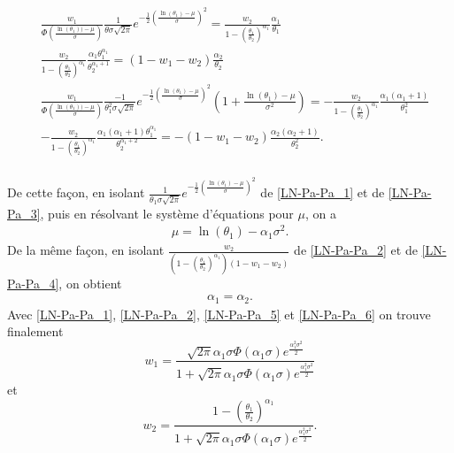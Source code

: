 	\begin{align}
		&\frac{w_1}{\Phi \left( \frac{\ln(\theta_1))- \mu}{\sigma} \right)}
		\frac{1}{\theta \sigma \sqrt{2 \pi}} e^{-\frac{1}{2} \left( \frac{\ln(\theta_1)- \mu}{\sigma} \right)^2}
		= \frac{w_2}{1-\left(\frac{\theta_1}{\theta_2}\right)^{\alpha_1}} \frac{\alpha_1}{\theta_1} \label{LN-Pa-Pa_1} \\
		&\frac{w_2}{1-\left(\frac{\theta_1}{\theta_2}\right)^{\alpha_1}} 
		\frac{\alpha_1 \theta_1^{\alpha_1}}{\theta_2^{\alpha_1+1}} 
		= (1-w_1-w_2) \frac{\alpha_2}{\theta_2}  \label{LN-Pa-Pa_2} \\
		&\frac{w_1}{\Phi \left( \frac{\ln(\theta_1))- \mu}{\sigma} \right)}
		\frac{-1}{\theta_1^2 \sigma \sqrt{2 \pi}} e^{-\frac{1}{2} \left( \frac{\ln(\theta_1)- \mu}{\sigma} \right)^2}
		(1+\frac{\ln(\theta_1) -\mu}{\sigma^2})
		= -\frac{w_2}{1-\left(\frac{\theta_1}{\theta_2}\right)^{\alpha_1}} 
		\frac{\alpha_1 (\alpha_1+1)}{\theta_1^2} \label{LN-Pa-Pa_3} \\
		&-\frac{w_2}{1-\left(\frac{\theta_1}{\theta_2}\right)^{\alpha_1}} 
		\frac{\alpha_1  (\alpha_1+1) \theta_1^{\alpha_1}}{\theta_2^{\alpha_1+2}} 
		=- (1-w_1-w_2) \frac{\alpha_2  (\alpha_2+1)}{\theta_2^2}. \label{LN-Pa-Pa_4} \\
	\end{align}
	
	De cette façon, en isolant $\frac{1}{\theta_1 \sigma \sqrt{2 \pi}} e^{-\frac{1}{2} \left( \frac{\ln(\theta_1)- \mu}{\sigma} \right)^2}$ de \ref{LN-Pa-Pa_1} et de \ref{LN-Pa-Pa_3}, puis en résolvant le système d'équations pour $\mu$, on a 
	\begin{align}
	\mu = \ln (\theta_1) - \alpha_1 \sigma^2.\label{LN-Pa-Pa_5}
	\end{align}
	De la même façon, en isolant $\frac{w_2}{\left(1-\left(\frac{\theta_1}{\theta_2}\right)^{\alpha_1}\right)  (1-w_1-w_2)}$ de \ref{LN-Pa-Pa_2} et de \ref{LN-Pa-Pa_4}, on obtient
	\begin{align}
	\alpha_1 = \alpha_2.\label{LN-Pa-Pa_6}
	\end{align}
	Avec \ref{LN-Pa-Pa_1}, \ref{LN-Pa-Pa_2}, \ref{LN-Pa-Pa_5} et \ref{LN-Pa-Pa_6} on trouve finalement
	$$w_1 = \frac{\sqrt{2 \pi} \alpha_1 \sigma \Phi(\alpha_1 \sigma) e^{\frac{\alpha_1^2 \sigma ^2}{2}}}{1+\sqrt{2 \pi} \alpha_1 \sigma \Phi(\alpha_1 \sigma) e^{\frac{\alpha_1^2 \sigma ^2}{2}}}$$ 
	et
	$$w_2 = \frac{1-\left(\frac{\theta_1}{\theta_2}\right)^{\alpha_1}}{1+\sqrt{2 \pi} \alpha_1 \sigma \Phi(\alpha_1 \sigma) e^{\frac{\alpha_1^2 \sigma ^2}{2}}}.$$ 
	

